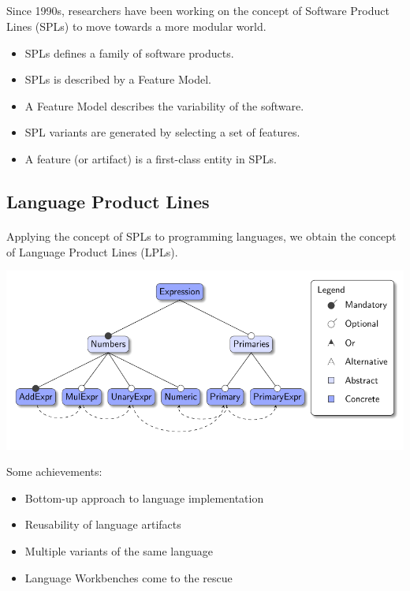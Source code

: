 \documentclass[9pt,xcolor=table,svgnames]{beamer}
\begin{document}
\subsection[ ]{}

\begin{frame}{\secname}
    \framesubtitle{\subsecname}

    Since 1990s, researchers have been working on the concept of \alert{Software Product Lines} (SPLs) to move towards a more \alert{modular} world.

    \bigskip
    \pause

    \begin{itemize}
        \item SPLs defines a \alert{family} of software products.
        \item SPLs is described by a \alert{Feature Model}.
        \item A Feature Model describes the \alert{variability} of the software.
        \item SPL \alert{variants} are generated by selecting a set of features.
        \item A \alert{feature} (or \alert{artifact}) is a first-class entity in SPLs.
    \end{itemize}
\end{frame}

\subsection[LPLs]{Language Product Lines}
\begin{frame}{\secname}
    \framesubtitle{\subsecname}
    Applying the concept of SPLs to programming languages, we obtain the concept of \alert{Language Product Lines} (LPLs).

    \bigskip
    \includegraphics[width=1\textwidth]{figs/feature-model.pdf}

    \pause

    \huge Some achievements:
    \begin{itemize}
        \item \alert{Bottom-up} approach to language implementation
        \item \alert{Reusability} of language artifacts
        \item Multiple \alert{variants} of the same language
        \item \alert{Language Workbenches} come to the rescue
    \end{itemize}
\end{frame}
\end{document}
